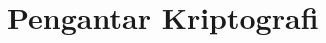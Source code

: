 \documentclass[../buku_kriptografi.tex]{subfiles}
\begin{document}
\ifdefined\InMainDocument\else\setcounter{chapter}{0}\fi

\chapter{Pengantar Kriptografi}









\ifdefined\InMainDocument\else


\fi
\end{document}
